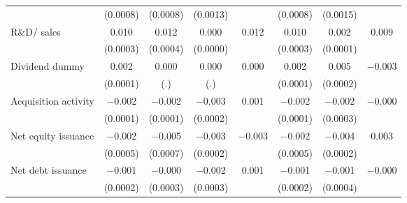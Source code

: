 \begin{tabular}{l*{7}{c}}
                    &    (0.0008)&    (0.0008)&    (0.0013)&            &    (0.0008)&    (0.0015)&            \\
\addlinespace
R\&D/ sales         &       0.010&       0.012&       0.000&       0.012&       0.010&       0.002&       0.009\\
                    &    (0.0003)&    (0.0004)&    (0.0000)&            &    (0.0003)&    (0.0001)&            \\
\addlinespace
Dividend dummy      &       0.002&       0.000&       0.000&       0.000&       0.002&       0.005&    $-$0.003\\
                    &    (0.0001)&         (.)&         (.)&            &    (0.0001)&    (0.0002)&            \\
\addlinespace
Acquisition activity&    $-$0.002&    $-$0.002&    $-$0.003&       0.001&    $-$0.002&    $-$0.002&    $-$0.000\\
                    &    (0.0001)&    (0.0001)&    (0.0002)&            &    (0.0001)&    (0.0003)&            \\
\addlinespace
Net equity issuance &    $-$0.002&    $-$0.005&    $-$0.003&    $-$0.003&    $-$0.002&    $-$0.004&       0.003\\
                    &    (0.0005)&    (0.0007)&    (0.0002)&            &    (0.0005)&    (0.0002)&            \\
\addlinespace
Net debt issuance   &    $-$0.001&    $-$0.000&    $-$0.002&       0.001&    $-$0.001&    $-$0.001&    $-$0.000\\
                    &    (0.0002)&    (0.0003)&    (0.0003)&            &    (0.0002)&    (0.0004)&            \\
\bottomrule
\end{tabular}
